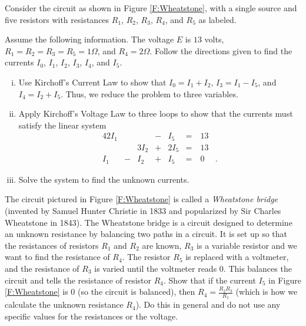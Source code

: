 \begin{pactivity} Consider the circuit as shown in Figure \ref{F:Wheatstone}, with a single source and five resistors with resistances $R_1$, $R_2$,  $R_3$, $R_4$, and $R_5$ as labeled. 
\ba
\item Assume the following information. The voltage $E$ is $13$ volts, $R_1=R_2=R_3=R_5= 1 \Omega$, and $R_4 = 2  \Omega$. Follow the directions given to find the currents $I_0$, $I_1$, $I_2$, $I_3$, $I_4$, and $I_5$. 
	\begin{enumerate}[i.]
	\item Use Kirchoff's Current Law to show that $I_0 = I_1+I_2$, $I_3 = I_1-I_5$, and  $I_4 = I_2 + I_5$. Thus, we reduce the problem to three variables. 

	\item Apply Kirchoff's Voltage Law to three loops to show that the currents must satisfy the linear system 
\begin{alignat}{4}
{2}I_1	&{}{}		&{}	 	&{}-{}	&{}I_5 	&= & \ 13&{}   \label{eq:Wheatstone_1} \\ 
{}	 	&{}{}		&{3}I_2 	&{}+{}	&{2}I_5 	&= & \ 13&{}  \label{eq:Wheatstone_2}  \\ 
{}I_1 	&{}-{}	&{}I_2 	&{}+{}	&{}I_5 	&= & \ 0&{.}   \label{eq:Wheatstone_3} 
\end{alignat}

	\item Solve the system to find the unknown currents.
	

	\end{enumerate}

\item The circuit pictured in Figure \ref{F:Wheatstone} is called a \emph{Wheatstone bridge} (invented by Samuel Hunter Christie in 1833 and popularized by Sir Charles Wheatstone in 1843). The Wheatstone bridge is a circuit designed to determine an unknown resistance by balancing two paths in a circuit. It is set up so that the resistances of resistors $R_1$ and $R_2$ are known, $R_3$ is a variable resistor and we want to find the resistance of $R_4$. The resistor $R_5$ is replaced with a voltmeter, and the resistance of $R_3$ is varied until the voltmeter reads $0$. This balances the circuit and tells the resistance of resistor $R_4$. Show that if the current $I_5$ in Figure \ref{F:Wheatstone} is $0$ (so the circuit is balanced), then $R_4 = \frac{R_2R_3}{R_1}$ (which is how we calculate the unknown resistance $R_4$). Do this in general and do not use any specific values for the resistances or the voltage. 


\ea
\end{pactivity}


